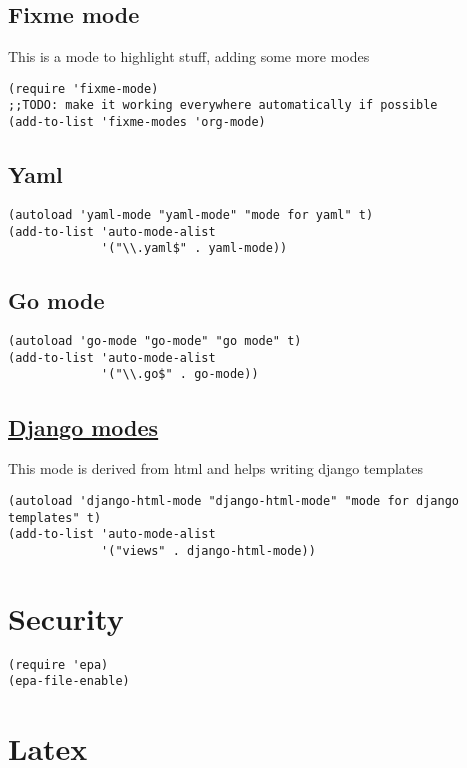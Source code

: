 \documentclass[11pt]{article}
\begin{document}
\subsection{Fixme mode}
\label{sec-31.15}

   This is a mode to highlight stuff, adding some more modes
\begin{verbatim}
(require 'fixme-mode)
;;TODO: make it working everywhere automatically if possible
(add-to-list 'fixme-modes 'org-mode)
\end{verbatim}
\subsection{Yaml}
\label{sec-31.16}

\begin{verbatim}
(autoload 'yaml-mode "yaml-mode" "mode for yaml" t)
(add-to-list 'auto-mode-alist
             '("\\.yaml$" . yaml-mode))
\end{verbatim}
\subsection{Go mode}
\label{sec-31.17}

\begin{verbatim}
(autoload 'go-mode "go-mode" "go mode" t)
(add-to-list 'auto-mode-alist
             '("\\.go$" . go-mode))
\end{verbatim}
\subsection{\href{http://code.djangoproject.com/wiki/Emacs}{Django modes}}
\label{sec-31.18}

   This mode is derived from html and helps writing django templates
\begin{verbatim}
(autoload 'django-html-mode "django-html-mode" "mode for django templates" t)
(add-to-list 'auto-mode-alist
             '("views" . django-html-mode))
\end{verbatim}
\section{Security}
\label{sec-32}

\begin{verbatim}
(require 'epa)
(epa-file-enable)
\end{verbatim}
\section{Latex}
\label{sec-33}
\end{document}
